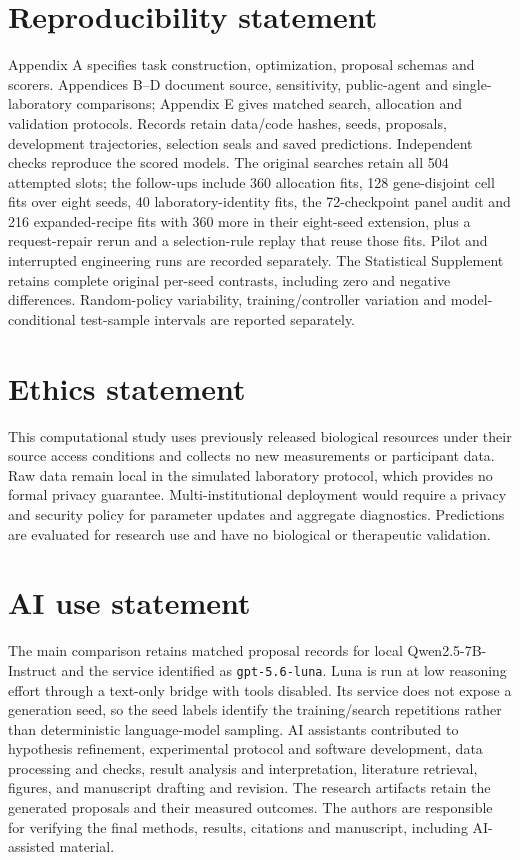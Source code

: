 \section*{Reproducibility statement}
Appendix A specifies task construction, optimization, proposal schemas and scorers. Appendices B--D document source, sensitivity, public-agent and single-laboratory comparisons; Appendix E gives matched search, allocation and validation protocols. Records retain data/code hashes, seeds, proposals, development trajectories, selection seals and saved predictions. Independent checks reproduce the scored models. The original searches retain all 504 attempted slots; the follow-ups include 360 allocation fits, 128 gene-disjoint cell fits over eight seeds, 40 laboratory-identity fits, the 72-checkpoint panel audit and 216 expanded-recipe fits with 360 more in their eight-seed extension, plus a request-repair rerun and a selection-rule replay that reuse those fits. Pilot and interrupted engineering runs are recorded separately. The Statistical Supplement retains complete original per-seed contrasts, including zero and negative differences. Random-policy variability, training/controller variation and model-conditional test-sample intervals are reported separately.

\section*{Ethics statement}
This computational study uses previously released biological resources under their source access conditions and collects no new measurements or participant data. Raw data remain local in the simulated laboratory protocol, which provides no formal privacy guarantee. Multi-institutional deployment would require a privacy and security policy for parameter updates and aggregate diagnostics. Predictions are evaluated for research use and have no biological or therapeutic validation.

\section*{AI use statement}
The main comparison retains matched proposal records for local Qwen2.5-7B-Instruct and the service identified as \texttt{gpt-5.6-luna}. Luna is run at low reasoning effort through a text-only bridge with tools disabled. Its service does not expose a generation seed, so the seed labels identify the training/search repetitions rather than deterministic language-model sampling. AI assistants contributed to hypothesis refinement, experimental protocol and software development, data processing and checks, result analysis and interpretation, literature retrieval, figures, and manuscript drafting and revision. The research artifacts retain the generated proposals and their measured outcomes. The authors are responsible for verifying the final methods, results, citations and manuscript, including AI-assisted material.



